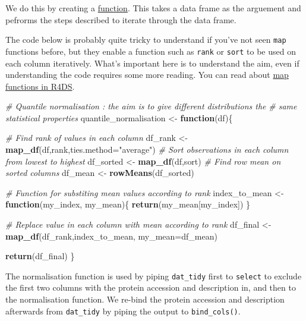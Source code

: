 \documentclass[12pt,]{book}
\newenvironment{Shaded}{\begin{snugshade}}{\end{snugshade}}
\newcommand{\KeywordTok}[1]{\textcolor[rgb]{0.13,0.29,0.53}{\textbf{#1}}}
\newcommand{\DataTypeTok}[1]{\textcolor[rgb]{0.13,0.29,0.53}{#1}}
\newcommand{\StringTok}[1]{\textcolor[rgb]{0.31,0.60,0.02}{#1}}
\newcommand{\CommentTok}[1]{\textcolor[rgb]{0.56,0.35,0.01}{\textit{#1}}}
\newcommand{\ControlFlowTok}[1]{\textcolor[rgb]{0.13,0.29,0.53}{\textbf{#1}}}
\newcommand{\NormalTok}[1]{#1}
\theoremstyle{definition}
\theoremstyle{definition}
\theoremstyle{definition}
\theoremstyle{remark}
\begin{document}
We do this by creating a \protect\hyperlink{function-anatomy}{function}.
This takes a data frame as the arguement and pefrorms the steps
described to iterate through the data frame.

The code below is probably quite tricky to understand if you've not seen
\texttt{map} functions before, but they enable a function such as
\texttt{rank} or \texttt{sort} to be used on each column iteratively.
What's important here is to understand the aim, even if understanding
the code requires some more reading. You can read about
\href{http://r4ds.had.co.nz/iteration.html\#the-map-functions}{map
functions in R4DS}.

\begin{Shaded}
\begin{Highlighting}[]
\CommentTok{# Quantile normalisation : the aim is to give different distributions the}
\CommentTok{# same statistical properties}
\NormalTok{quantile_normalisation <-}\StringTok{ }\ControlFlowTok{function}\NormalTok{(df)\{}
  
  \CommentTok{# Find rank of values in each column}
\NormalTok{  df_rank <-}\StringTok{ }\KeywordTok{map_df}\NormalTok{(df,rank,}\DataTypeTok{ties.method=}\StringTok{"average"}\NormalTok{)}
  \CommentTok{# Sort observations in each column from lowest to highest }
\NormalTok{  df_sorted <-}\StringTok{ }\KeywordTok{map_df}\NormalTok{(df,sort)}
  \CommentTok{# Find row mean on sorted columns}
\NormalTok{  df_mean <-}\StringTok{ }\KeywordTok{rowMeans}\NormalTok{(df_sorted)}
  
  \CommentTok{# Function for substiting mean values according to rank }
\NormalTok{  index_to_mean <-}\StringTok{ }\ControlFlowTok{function}\NormalTok{(my_index, my_mean)\{}
    \KeywordTok{return}\NormalTok{(my_mean[my_index])}
\NormalTok{  \}}
  
  \CommentTok{# Replace value in each column with mean according to rank }
\NormalTok{  df_final <-}\StringTok{ }\KeywordTok{map_df}\NormalTok{(df_rank,index_to_mean, }\DataTypeTok{my_mean=}\NormalTok{df_mean)}
  
  \KeywordTok{return}\NormalTok{(df_final)}
\NormalTok{\}}
\end{Highlighting}
\end{Shaded}

The normalisation function is used by piping \texttt{dat\_tidy} first to
\texttt{select} to exclude the first two columns with the protein
accession and description in, and then to the normalisation function. We
re-bind the protein accession and description afterwards from
\texttt{dat\_tidy} by piping the output to \texttt{bind\_cols()}.
\end{document}
